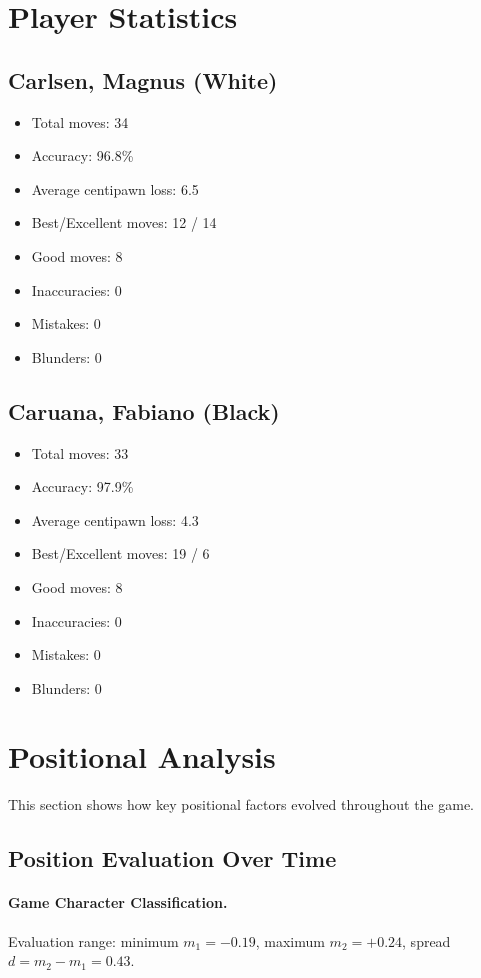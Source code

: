 \documentclass[11pt]{book}
\begin{document}
\section{Player Statistics}

\subsection{Carlsen, Magnus (White)}
\begin{itemize}
\item Total moves: 34
\item Accuracy: 96.8\%
\item Average centipawn loss: 6.5
\item Best/Excellent moves: 12 / 14
\item Good moves: 8
\item Inaccuracies: 0
\item Mistakes: 0
\item Blunders: 0
\end{itemize}

\subsection{Caruana, Fabiano (Black)}
\begin{itemize}
\item Total moves: 33
\item Accuracy: 97.9\%
\item Average centipawn loss: 4.3
\item Best/Excellent moves: 19 / 6
\item Good moves: 8
\item Inaccuracies: 0
\item Mistakes: 0
\item Blunders: 0
\end{itemize}

\section{Positional Analysis}

This section shows how key positional factors evolved throughout the game.

\subsection{Position Evaluation Over Time}

\paragraph{Game Character Classification.}
Evaluation range: minimum $m_1 = -0.19$, maximum $m_2 = +0.24$, spread $d = m_2 - m_1 = 0.43$.
\end{document}
